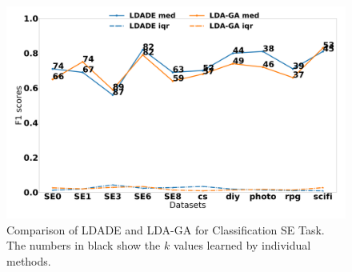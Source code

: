 \documentclass[twocolumn,5p,sort&compress]{elsarticle}
\theoremstyle{break}
\begin{document}
\begin{figure}[!t]
  \includegraphics[width=\linewidth]{./fig/F1_ga.png}
  \caption{Comparison of LDADE and LDA-GA for Classification SE Task. The numbers in black show the $k$ values
  learned by individual methods.}
  \label{fig:ldade_ga}
\end{figure}
\end{document}
